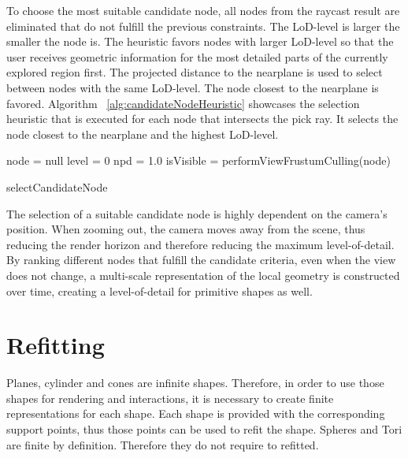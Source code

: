 To choose the most suitable candidate node, all nodes from the raycast result are eliminated that do not fulfill the previous constraints. The LoD-level is larger the smaller the node is. The heuristic favors nodes with larger LoD-level so that the user receives geometric information for the most detailed parts of the currently explored region first. The projected distance to the nearplane is used to select between nodes with the same LoD-level. The node closest to the nearplane is favored. Algorithm ~\ref{alg:candidateNodeHeuristic} showcases the selection heuristic that is executed for each node that intersects the pick ray. It selects the node closest to the nearplane and the highest LoD-level.

\begin{algorithm}
	
	node 	= null\;
	level = 0\;
	npd 	= 1.0\;
	{
		isVisible = performViewFrustumCulling(node)\;
	}
\caption{selectCandidateNode}
\label{alg:candidateNodeHeuristic}
\end{algorithm}

The selection of a suitable candidate node is highly dependent on the camera's position. When zooming out, the camera moves away from the scene, thus reducing the render horizon and therefore reducing the maximum level-of-detail. By ranking different nodes that fulfill the candidate criteria, even when the view does not change, a multi-scale representation of the local geometry is constructed over time, creating a level-of-detail for primitive shapes as well. 

\section{Refitting}
\label{sec:Refitting}
Planes, cylinder and cones are infinite shapes. Therefore, in order to use those shapes for rendering and interactions, it is necessary to create finite representations for each shape. Each shape is provided with the corresponding support points, thus those points can be used to refit the shape. 
Spheres and Tori are finite by definition. Therefore they do not require to refitted. 

